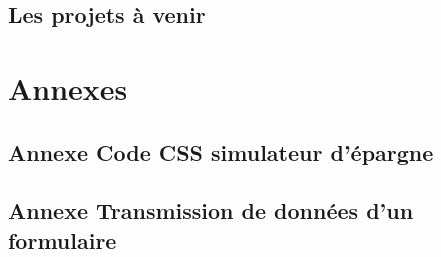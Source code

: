 \documentclass[a4paper,11pt,twoside]{report}
\begin{document}
  \section*{Les projets à venir}

\chapter*{Annexes}
\thispagestyle{\chead{}}
  \section*{Annexe Code CSS simulateur d'épargne}
  \label{code_CSS_simulateur_d_epargne}
  
  
    \newpage
  
  \section*{Annexe Transmission de données d'un formulaire}
  \label{transmission_de_donnees_d_un_formulaire}
  
  
    \newpage
  
\end{document}
